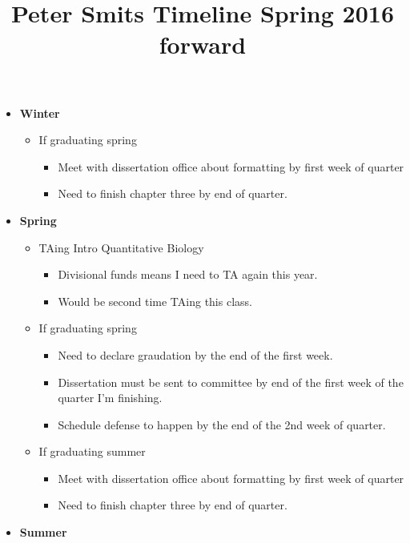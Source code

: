 \documentclass{article}
\title{Peter Smits Timeline Spring 2016 forward}
\date{}
\begin{document}
\linenumbers
\modulolinenumbers[2]

\maketitle
  
\begin{itemize}
  \item \textbf{Winter}
    \begin{itemize}
      \item If graduating spring
        \begin{itemize}
          \item Meet with dissertation office about formatting by first week of quarter
          \item Need to finish chapter three by end of quarter.
        \end{itemize}
    \end{itemize}
  \item \textbf{Spring}
    \begin{itemize}
      \item TAing Intro Quantitative Biology
        \begin{itemize}
          \item Divisional funds means I need to TA again this year.
          \item Would be second time TAing this class.
        \end{itemize}
      \item If graduating spring
        \begin{itemize}
          \item Need to declare graudation by the end of the first week.
          \item Dissertation must be sent to committee by end of the first week of the quarter I'm finishing.
          \item Schedule defense to happen by the end of the 2nd week of quarter.
        \end{itemize}
      \item If graduating summer
        \begin{itemize}
          \item Meet with dissertation office about formatting by first week of quarter
          \item Need to finish chapter three by end of quarter.
        \end{itemize}
    \end{itemize}
  \item \textbf{Summer}

\end{itemize}
\end{document}
